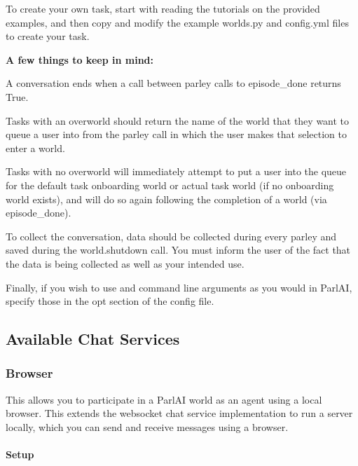 To create your own task, start with reading the tutorials on the provided examples, and then copy and modify the example {\ttfamily worlds.\+py} and {\ttfamily config.\+yml} files to create your task.

{\bfseries A few things to keep in mind\+:}


\begin{DoxyEnumerate}
\item A conversation ends when a call between {\ttfamily parley} calls to {\ttfamily episode\+\_\+done} returns True.
\item Tasks with an overworld should return the name of the world that they want to queue a user into from the {\ttfamily parley} call in which the user makes that selection to enter a world.
\item Tasks with no overworld will immediately attempt to put a user into the queue for the default task onboarding world or actual task world (if no onboarding world exists), and will do so again following the completion of a world (via {\ttfamily episode\+\_\+done}).
\end{DoxyEnumerate}
\begin{DoxyEnumerate}
\item To collect the conversation, data should be collected during every {\ttfamily parley} and saved during the {\ttfamily world.\+shutdown} call. You must inform the user of the fact that the data is being collected as well as your intended use.
\item Finally, if you wish to use and command line arguments as you would in Parl\+AI, specify those in the {\ttfamily opt} section of the config file.
\end{DoxyEnumerate}

\subsection*{Available Chat Services}

\subsubsection*{Browser}

This allows you to participate in a Parl\+AI world as an agent using a local browser. This extends the {\ttfamily websocket} chat service implementation to run a server locally, which you can send and receive messages using a browser.

\paragraph*{Setup}


